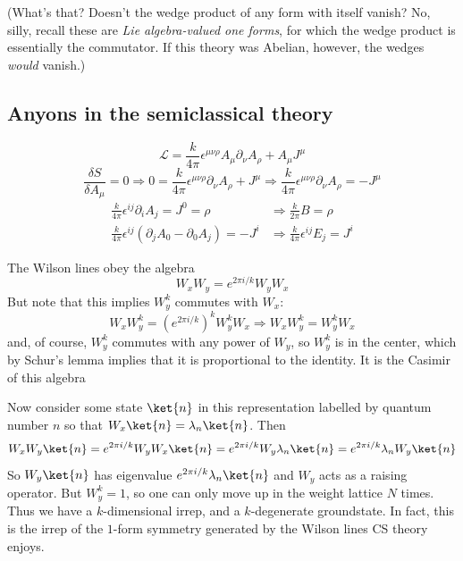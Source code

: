\documentclass{report}
\begin{document}
(What's that? Doesn't the wedge product of any form with itself vanish? No, silly, 
recall these are \textit{Lie algebra-valued one forms}, for which the wedge product 
is essentially the commutator. If this theory was Abelian, however, the wedges 
\textit{would} vanish.)

\subsection{Anyons in the semiclassical theory}
\begin{equation*}
	\mathcal{L}
		= \frac{k}{4\pi} \epsilon^{\mu\nu\rho} A_\mu \partial_\nu A_\rho
			+ A_\mu J^\mu
\end{equation*}
\begin{equation*}
	\frac{\delta S}{\delta A_\mu}
		= 0 \Longrightarrow 
		0 = \frac{k}{4\pi}\epsilon^{\mu\nu\rho} \partial_\nu A_\rho + J^\mu
		\Longrightarrow  
		\frac{k}{4\pi} \epsilon^{\mu\nu\rho} \partial_\nu A_\rho = -J^\mu
\end{equation*}
\begin{align*}
	\frac{k}{4\pi} \epsilon^{ij}\partial_i A_j = J^0 = \rho 
	&\Longrightarrow \frac{k}{2\pi} B = \rho\\ 
	\frac{k}{4\pi} \epsilon^{ij} (\partial_j A_0 - \partial_0 A_j)
		= -J^i 
	&\Longrightarrow \frac{k}{4\pi}\epsilon^{ij} E_j = J^i
\end{align*}

The Wilson lines obey the algebra 
\begin{equation*}
	W_x W_y = e^{2\pi i / k} W_y W_x
\end{equation*}
But note that this implies $ W_y^k $ commutes with $ W_x $:
\begin{equation*}
	W_x W_y^k = (e^{2\pi i / k})^k W_y^k W_x
		\Longrightarrow W_x W_y^k  = W_y^k W_x
\end{equation*}
and, of course, $ W_y^k $ commutes with any power of $ W_y $, so $ W_y^k $ is 
in the center, which by Schur's lemma implies that it is proportional to the 
identity. It is the Casimir of this algebra

Now consider some state $ \ket{n} $ in this representation labelled by quantum 
number $ n $ so that $ W_x\ket{n} = \lambda_n \ket{n} $. Then
\begin{equation*}
	W_x W_y \ket{n} = e^{2\pi i / k} W_y W_x \ket{n} 
		= e^{2\pi i / k} W_y \lambda_n \ket{n} 
		= e^{2\pi i/ k}\lambda_n W_y \ket{n}
\end{equation*}
So $ W_y\ket{n} $ has eigenvalue $ e^{2\pi i / k}\lambda_n \ket{n} $ and $ W_y $
acts as a raising operator. But $ W_y^k = 1 $, so one can only move up in the 
weight lattice $ N $ times. Thus we have a $ k $-dimensional irrep, and a 
$ k $-degenerate groundstate. In fact, this is the irrep of the $ 1 $-form 
symmetry generated by the Wilson lines CS theory enjoys.
\end{document}
